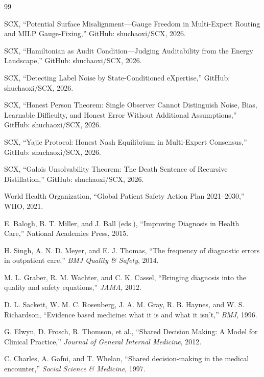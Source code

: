 \documentclass[12pt,a4paper]{article}
\theoremstyle{remark}
\begin{document}
\begin{thebibliography}{99}

SCX,
``Potential Surface Misalignment---Gauge Freedom in Multi-Expert Routing and MILP Gauge-Fixing,''
GitHub: shuchaoxi/SCX, 2026.

SCX,
``Hamiltonian as Audit Condition---Judging Auditability from the Energy Landscape,''
GitHub: shuchaoxi/SCX, 2026.

SCX,
``Detecting Label Noise by State-Conditioned eXpertise,''
GitHub: shuchaoxi/SCX, 2026.

SCX,
``Honest Person Theorem: Single Observer Cannot Distinguish Noise, Bias, Learnable Difficulty, and Honest Error Without Additional Assumptions,''
GitHub: shuchaoxi/SCX, 2026.

SCX,
``Yajie Protocol: Honest Nash Equilibrium in Multi-Expert Consensus,''
GitHub: shuchaoxi/SCX, 2026.

SCX,
``Galois Unsolvability Theorem: The Death Sentence of Recursive Distillation,''
GitHub: shuchaoxi/SCX, 2026.

World Health Organization,
``Global Patient Safety Action Plan 2021--2030,''
WHO, 2021.

E. Balogh, B. T. Miller, and J. Ball (eds.),
``Improving Diagnosis in Health Care,''
National Academies Press, 2015.

H. Singh, A. N. D. Meyer, and E. J. Thomas,
``The frequency of diagnostic errors in outpatient care,''
\textit{BMJ Quality \& Safety}, 2014.

M. L. Graber, R. M. Wachter, and C. K. Cassel,
``Bringing diagnosis into the quality and safety equations,''
\textit{JAMA}, 2012.

D. L. Sackett, W. M. C. Rosenberg, J. A. M. Gray, R. B. Haynes, and W. S. Richardson,
``Evidence based medicine: what it is and what it isn't,''
\textit{BMJ}, 1996.

G. Elwyn, D. Frosch, R. Thomson, et al.,
``Shared Decision Making: A Model for Clinical Practice,''
\textit{Journal of General Internal Medicine}, 2012.

C. Charles, A. Gafni, and T. Whelan,
``Shared decision-making in the medical encounter,''
\textit{Social Science \& Medicine}, 1997.


\end{thebibliography}
\end{document}
